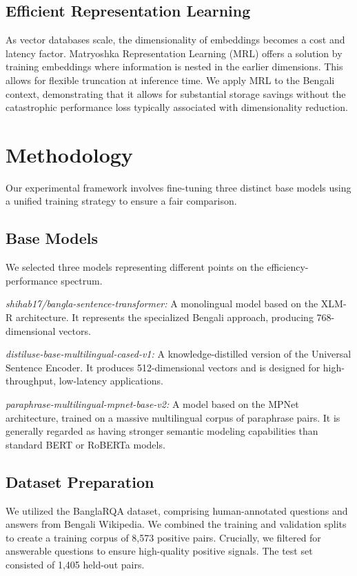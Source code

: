 \documentclass[10pt, conference, compsocconf]{IEEEtran}
\begin{document}
\subsection{Efficient Representation Learning}
As vector databases scale, the dimensionality of embeddings becomes a cost and latency factor. Matryoshka Representation Learning (MRL) offers a solution by training embeddings where information is nested in the earlier dimensions. This allows for flexible truncation at inference time. We apply MRL to the Bengali context, demonstrating that it allows for substantial storage savings without the catastrophic performance loss typically associated with dimensionality reduction.

\section{Methodology}

Our experimental framework involves fine-tuning three distinct base models using a unified training strategy to ensure a fair comparison.

\subsection{Base Models}
We selected three models representing different points on the efficiency-performance spectrum.

\textit{shihab17/bangla-sentence-transformer:} A monolingual model based on the XLM-R architecture. It represents the specialized Bengali approach, producing 768-dimensional vectors.

\textit{distiluse-base-multilingual-cased-v1:} A knowledge-distilled version of the Universal Sentence Encoder. It produces 512-dimensional vectors and is designed for high-throughput, low-latency applications.

\textit{paraphrase-multilingual-mpnet-base-v2:} A model based on the MPNet architecture, trained on a massive multilingual corpus of paraphrase pairs. It is generally regarded as having stronger semantic modeling capabilities than standard BERT or RoBERTa models.

\subsection{Dataset Preparation}
We utilized the BanglaRQA dataset, comprising human-annotated questions and answers from Bengali Wikipedia. We combined the training and validation splits to create a training corpus of 8,573 positive pairs. Crucially, we filtered for answerable questions to ensure high-quality positive signals. The test set consisted of 1,405 held-out pairs.
\end{document}
